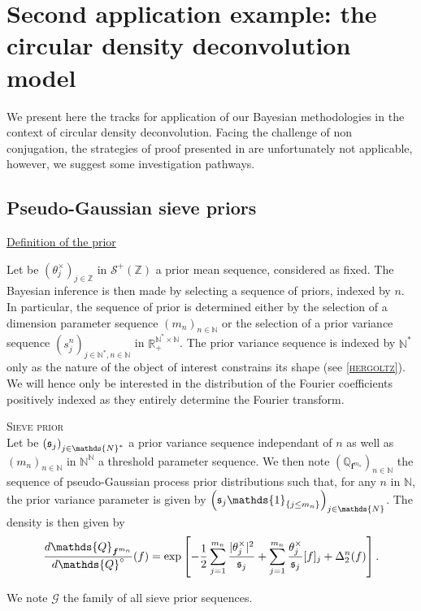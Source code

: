 \section{Second application example: the circular density deconvolution model}\label{BAYES_CIRCULARDECON}


We present here the tracks for application of our Bayesian methodologies in the context of circular density deconvolution.
Facing the challenge of non conjugation, the strategies of proof presented in  are unfortunately not applicable, however, we suggest some investigation pathways.

\subsection{Pseudo-Gaussian sieve priors}\label{2.5.1}
\underline{Definition of the prior}

Let be $\left(\theta^{\times}_{j}\right)_{j \in \mathds{Z}}$ in $\mathcal{S}^{+}(\mathds{Z})$ a prior mean sequence, considered as fixed.
The Bayesian inference is then made by selecting a sequence of priors, indexed by $n$.
In particular, the sequence of prior is determined either by the selection of a dimension parameter sequence $\left(m_{n}\right)_{n \in \mathds{N}}$ or the selection of a prior variance sequence $\left(s_{j}^{n}\right)_{j \in \mathds{N}^{*}, n \in \mathds{N}}$ in $\mathds{R}_{+}^{\mathds{N}^{*} \times \mathds{N}}$.
The prior variance sequence is indexed by $\mathds{N}^{*}$ only as the nature of the object of interest constrains its shape (see \textsc{\autoref{hergoltz}}).
We will hence only be interested in the distribution of the Fourier coefficients positively indexed as they entirely determine the Fourier transform.


\begin{de}{\textsc{Sieve prior}\\}\label{de2.5.2}
Let be $\left(\frak{s}_{j}\right)_{j \in \mathds{N}^{*}}$ a prior variance sequence independant of $n$ as well as $\left(m_{n}\right)_{n \in \mathds{N}}$ in $\mathds{N}^{\mathds{N}}$ a threshold parameter sequence.
We then note $\left(\mathds{Q}_{\boldsymbol{f}^{m_{n}}}\right)_{n \in \mathds{N}}$ the sequence of pseudo-Gaussian process prior distributions such that, for any $n$ in $\mathds{N}$, the prior variance parameter is given by $\left(\frak{s}_{j} \mathds{1}_{\{j \leq m_{n}\}}\right)_{j \in \mathds{N}}$.
The density is then given by
\[\frac{d \mathds{Q}_{\boldsymbol{f}^{m_{n}}}}{d \mathds{Q}^{\circ}}(f) = \exp\left[-\frac{1}{2}\sum\limits_{j = 1}^{m_{n}} \frac{\vert \theta^{\times}_{j}\vert^{2}}{\frak{s}_{j}} + \sum\limits_{j = 1}^{m_{n}} \frac{\theta^{\times}_{j}}{\frak{s}_{j}}[f]_{j} +\Delta_{2}^{n}(f)\right].\]

We note $\mathcal{G}$ the family of all sieve prior sequences.
\end{de}


